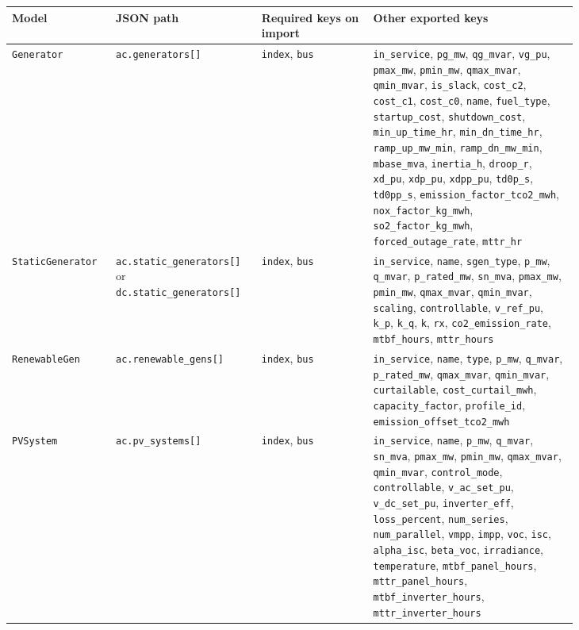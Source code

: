 \footnotesize
\begin{longtable}{L{0.14\linewidth}L{0.18\linewidth}L{0.18\linewidth}L{0.33\linewidth}}
\toprule
Model & JSON path & Required keys on import & Other exported keys \\
\midrule
\endhead
\texttt{Generator} & \texttt{ac.generators[]} & \texttt{index}, \texttt{bus} & \texttt{in\_service}, \texttt{pg\_mw}, \texttt{qg\_mvar}, \texttt{vg\_pu}, \texttt{pmax\_mw}, \texttt{pmin\_mw}, \texttt{qmax\_mvar}, \texttt{qmin\_mvar}, \texttt{is\_slack}, \texttt{cost\_c2}, \texttt{cost\_c1}, \texttt{cost\_c0}, \texttt{name}, \texttt{fuel\_type}, \texttt{startup\_cost}, \texttt{shutdown\_cost}, \texttt{min\_up\_time\_hr}, \texttt{min\_dn\_time\_hr}, \texttt{ramp\_up\_mw\_min}, \texttt{ramp\_dn\_mw\_min}, \texttt{mbase\_mva}, \texttt{inertia\_h}, \texttt{droop\_r}, \texttt{xd\_pu}, \texttt{xdp\_pu}, \texttt{xdpp\_pu}, \texttt{td0p\_s}, \texttt{td0pp\_s}, \texttt{emission\_factor\_tco2\_mwh}, \texttt{nox\_factor\_kg\_mwh}, \texttt{so2\_factor\_kg\_mwh}, \texttt{forced\_outage\_rate}, \texttt{mttr\_hr} \\
\texttt{StaticGenerator} & \texttt{ac.static\_generators[]} or \texttt{dc.static\_generators[]} & \texttt{index}, \texttt{bus} & \texttt{in\_service}, \texttt{name}, \texttt{sgen\_type}, \texttt{p\_mw}, \texttt{q\_mvar}, \texttt{p\_rated\_mw}, \texttt{sn\_mva}, \texttt{pmax\_mw}, \texttt{pmin\_mw}, \texttt{qmax\_mvar}, \texttt{qmin\_mvar}, \texttt{scaling}, \texttt{controllable}, \texttt{v\_ref\_pu}, \texttt{k\_p}, \texttt{k\_q}, \texttt{k}, \texttt{rx}, \texttt{co2\_emission\_rate}, \texttt{mtbf\_hours}, \texttt{mttr\_hours} \\
\texttt{RenewableGen} & \texttt{ac.renewable\_gens[]} & \texttt{index}, \texttt{bus} & \texttt{in\_service}, \texttt{name}, \texttt{type}, \texttt{p\_mw}, \texttt{q\_mvar}, \texttt{p\_rated\_mw}, \texttt{qmax\_mvar}, \texttt{qmin\_mvar}, \texttt{curtailable}, \texttt{cost\_curtail\_mwh}, \texttt{capacity\_factor}, \texttt{profile\_id}, \texttt{emission\_offset\_tco2\_mwh} \\
\texttt{PVSystem} & \texttt{ac.pv\_systems[]} & \texttt{index}, \texttt{bus} & \texttt{in\_service}, \texttt{name}, \texttt{p\_mw}, \texttt{q\_mvar}, \texttt{sn\_mva}, \texttt{pmax\_mw}, \texttt{pmin\_mw}, \texttt{qmax\_mvar}, \texttt{qmin\_mvar}, \texttt{control\_mode}, \texttt{controllable}, \texttt{v\_ac\_set\_pu}, \texttt{v\_dc\_set\_pu}, \texttt{inverter\_eff}, \texttt{loss\_percent}, \texttt{num\_series}, \texttt{num\_parallel}, \texttt{vmpp}, \texttt{impp}, \texttt{voc}, \texttt{isc}, \texttt{alpha\_isc}, \texttt{beta\_voc}, \texttt{irradiance}, \texttt{temperature}, \texttt{mtbf\_panel\_hours}, \texttt{mttr\_panel\_hours}, \texttt{mtbf\_inverter\_hours}, \texttt{mttr\_inverter\_hours} \\

\end{longtable}
